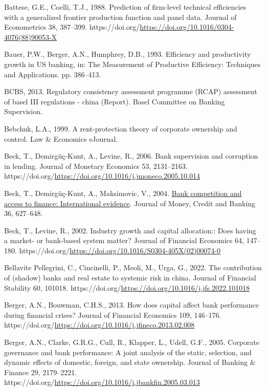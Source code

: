 \documentclass[
  letterpaper,
  DIV=11,
  numbers=noendperiod]{scrreprt}
\newlength{\cslhangindent}
\newenvironment{CSLReferences}[2] %
 {\begin{list}{}{%
  \setlength{\itemindent}{0pt}
  \setlength{\leftmargin}{0pt}
  \setlength{\parsep}{0pt}
  \ifodd #1
   \setlength{\leftmargin}{\cslhangindent}
   \setlength{\itemindent}{-1\cslhangindent}
  \fi
  \setlength{\itemsep}{#2\baselineskip}}}
 {\end{list}}
\begin{document}
\begin{CSLReferences}{1}{0}
Battese, G.E., Coelli, T.J., 1988. Prediction of firm-level technical
efficiencies with a generalized frontier production function and panel
data. Journal of Econometrics 38, 387--399.
https://doi.org/\url{https://doi.org/10.1016/0304-4076(88)90053-X}

Bauer, P.W., Berger, A.N., Humphrey, D.B., 1993. Efficiency and
productivity growth in US banking, in: The Measurement of Productive
Efficiency: Techniques and Applications. pp. 386--413.

BCBS, 2013. Regulatory consistency assessment programme (RCAP)
assessment of basel III regulations - china (Report). Basel Committee on
Banking Supervision.

Bebchuk, L.A., 1999. A rent-protection theory of corporate ownership and
control. Law \& Economics eJournal.

Beck, T., Demirgüç-Kunt, A., Levine, R., 2006. Bank supervision and
corruption in lending. Journal of Monetary Economics 53, 2131--2163.
https://doi.org/\url{https://doi.org/10.1016/j.jmoneco.2005.10.014}

Beck, T., Demirgüç-Kunt, A., Maksimovic, V., 2004.
\href{http://www.jstor.org.queens.ezp1.qub.ac.uk/stable/3838958}{Bank
competition and access to finance: International evidence}. Journal of
Money, Credit and Banking 36, 627--648.

Beck, T., Levine, R., 2002. Industry growth and capital allocation::
Does having a market- or bank-based system matter? Journal of Financial
Economics 64, 147--180.
https://doi.org/\url{https://doi.org/10.1016/S0304-405X(02)00074-0}

Bellavite Pellegrini, C., Cincinelli, P., Meoli, M., Urga, G., 2022. The
contribution of (shadow) banks and real estate to systemic risk in
china. Journal of Financial Stability 60, 101018.
https://doi.org/\url{https://doi.org/10.1016/j.jfs.2022.101018}

Berger, A.N., Bouwman, C.H.S., 2013. How does capital affect bank
performance during financial crises? Journal of Financial Economics 109,
146--176.
https://doi.org/\url{https://doi.org/10.1016/j.jfineco.2013.02.008}

Berger, A.N., Clarke, G.R.G., Cull, R., Klapper, L., Udell, G.F., 2005.
Corporate governance and bank performance: A joint analysis of the
static, selection, and dynamic effects of domestic, foreign, and state
ownership. Journal of Banking \& Finance 29, 2179--2221.
https://doi.org/\url{https://doi.org/10.1016/j.jbankfin.2005.03.013}


\end{CSLReferences}
\end{document}
